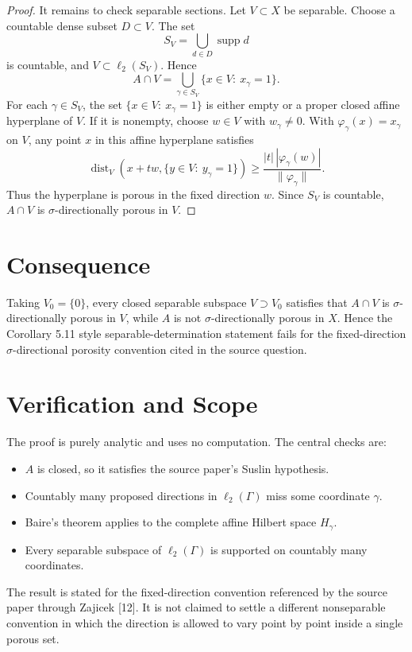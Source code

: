 \documentclass[11pt]{article}
\newcommand{\supp}{\operatorname{supp}}
\newcommand{\dist}{\operatorname{dist}}
\begin{document}
\begin{proof}
It remains to check separable sections.  Let $V\subset X$ be separable.  Choose
a countable dense subset $D\subset V$.  The set
\[
  S_V=\bigcup_{d\in D}\supp d
\]
is countable, and $V\subset \ell_2(S_V)$.  Hence
\[
  A\cap V
  =\bigcup_{\gamma\in S_V}\{x\in V:\ x_\gamma=1\}.
\]
For each $\gamma\in S_V$, the set $\{x\in V:\ x_\gamma=1\}$ is either empty
or a proper closed affine hyperplane of $V$.  If it is nonempty, choose
$w\in V$ with $w_\gamma\neq 0$.  With $\varphi_\gamma(x)=x_\gamma$ on $V$,
any point $x$ in this affine hyperplane satisfies
\[
  \dist_V(x+t w,\{y\in V:\ y_\gamma=1\})
  \ge \frac{|t|\,|\varphi_\gamma(w)|}{\|\varphi_\gamma\|}.
\]
Thus the hyperplane is porous in the fixed direction $w$.  Since $S_V$ is
countable, $A\cap V$ is $\sigma$-directionally porous in $V$.
\end{proof}

\section*{Consequence}

Taking $V_0=\{0\}$, every closed separable subspace $V\supset V_0$ satisfies
that $A\cap V$ is $\sigma$-directionally porous in $V$, while $A$ is not
$\sigma$-directionally porous in $X$.  Hence the Corollary 5.11 style
separable-determination statement fails for the fixed-direction
$\sigma$-directional porosity convention cited in the source question.

\section*{Verification and Scope}

The proof is purely analytic and uses no computation.  The central checks are:
\begin{itemize}
\item $A$ is closed, so it satisfies the source paper's Suslin hypothesis.
\item Countably many proposed directions in $\ell_2(\Gamma)$ miss some
coordinate $\gamma$.
\item Baire's theorem applies to the complete affine Hilbert space
$H_\gamma$.
\item Every separable subspace of $\ell_2(\Gamma)$ is supported on countably
many coordinates.
\end{itemize}

The result is stated for the fixed-direction convention referenced by the
source paper through Zajicek [12].  It is not claimed to settle a different
nonseparable convention in which the direction is allowed to vary point by
point inside a single porous set.
\end{document}
